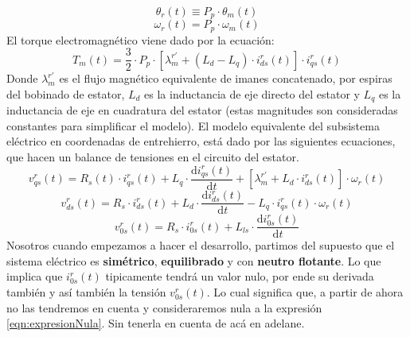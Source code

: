 \documentclass[10pt]{article}
\begin{document}
\begin{enumerate}
\begin{itemize}
\begin{equation}
		\end{equation}
		\\
		\begin{equation}
			\theta_{r} \left ( t \right ) \equiv P_{p} \cdot \theta_{m} \left ( t \right )
		\end{equation}
		\begin{equation}
			\omega_{r}\left ( t \right )=P_{p}\cdot \omega_{m}\left ( t \right )
		\end{equation}
		El torque electromagnético viene dado por la ecuación:
		\begin{equation}
			T_{m}\left ( t \right )=\frac{3}{2} \cdot P_{p} \cdot \left [ \lambda_{m}^{r'}+\left ( L_{d}-L_{q} \right )\cdot i_{ds}^{r} \left ( t \right ) \right ] \cdot i_{qs}^{r}\left ( t \right )
		\end{equation}
		Donde $\lambda_{m}^{r'}$ es el flujo magnético equivalente de imanes concatenado, por espiras del bobinado de estator,
		$L_{d}$ es la inductancia de eje directo del estator y $L_{q}$ es la inductancia de eje en cuadratura del estator (estas magnitudes son consideradas constantes para simplificar el modelo).
		El modelo equivalente del subsistema eléctrico en coordenadas de entrehierro, está dado por las siguientes ecuaciones, que hacen un balance de tensiones en el circuito del estator.
		\begin{equation}
			v_{qs}^{r}\left ( t \right )=R_{s}\left ( t \right )\cdot i_{qs}^{r}\left ( t \right )+L_{q}\cdot \frac{\mathrm{d} i_{qs}^{r}\left ( t \right )}{\mathrm{d} t}+\left [ \lambda_{m}^{r'}+L_{d}\cdot i_{ds}^{r}\left ( t \right ) \right ]\cdot \omega_{r}\left ( t \right )
		\end{equation}
		\begin{equation}
			v_{ds}^{r}\left ( t \right )=R_{s}\cdot i_{ds}^{r}\left ( t \right )+L_{d}\cdot \frac{\mathrm{d} i_{ds}^{r}\left ( t \right )}{\mathrm{d} t}-L_{q}\cdot i_{qs}^{r}\left ( t \right )\cdot \omega_{r}\left ( t \right )
		\end{equation}
		\begin{equation}
			\label{eqn:expresionNula}
			v_{0s}^{r}\left ( t \right )=R_{s}\cdot i_{0s}^{r}\left ( t \right )+L_{ls}\cdot \frac{\mathrm{d} i_{0s}^{r}\left ( t \right )}{\mathrm{d} t}
		\end{equation}
		Nosotros cuando empezamos a hacer el desarrollo, partimos del supuesto que el sistema eléctrico es \textbf{simétrico}, \textbf{equilibrado} y con \textbf{neutro flotante}. Lo que implica que $i_{0s}^{r}(t)$ tipicamente tendrá un valor nulo, por ende su derivada también y así también la tensión $v_{0s}^{r}(t)$.
		Lo cual significa que, a partir de ahora no las tendremos en cuenta y consideraremos nula a la expresión \ref{eqn:expresionNula}. Sin tenerla en cuenta de acá en adelane.
		


\end{itemize}
\end{enumerate}
\end{document}
